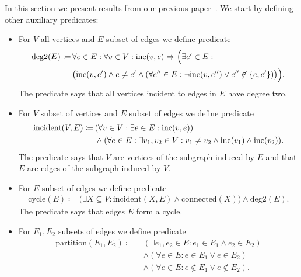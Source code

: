 In this section we present results from our previous paper~\cite{my_paper}.
We start by defining other auxiliary predicates:
%
\begin{itemize}
	\item For \( V \) all vertices and \( E \) subset of edges we define predicate
	      \begin{align*}
		      \text{deg2}(E) \coloneqq \,
		       & \forall e \in E : \forall v \in V : \text{inc} (v, e) \Rightarrow \Big( \exists e' \in E : \\
		       & \big( \text{inc} (v, e') \land e \ne e' \land (\forall e^{\prime\prime} \in E :
				      \lnot \text{inc} (v, e^{\prime\prime}) \lor e^{\prime\prime} \not\in \{e, e'\}) \big) \Big).
	      \end{align*}
	      The predicate says that all vertices incident to edges in \( E \) have degree two.
	\item For \( V \) subset of vertices and \( E \) subset of edges we define predicate
	      \begin{align*}
		      \text{incident}(V, E) \coloneqq \,
		       & (\forall v \in V : \exists e \in E : \text{inc} (v, e))                                                 \\
		       & \land (\forall e \in E : \exists v_1, v_2 \in V : v_1 \ne v_2 \land \text{inc} (v_1) \land \text{inc} (v_2)).
	      \end{align*}
	      The predicate says that \( V \) are vertices of the subgraph induced by \( E \)
	      and that \( E \) are edges of the subgraph induced by \( V \).
	\item For \( E \) subset of edges we define predicate
	      \begin{align*}
		      \text{cycle}(E) \coloneqq \,
		      \big( \exists X \subseteq V : \text{incident}(X, E) \land \text{connected}(X) \big)
		      \land \text{deg2}(E).
	      \end{align*}
	      The predicate says that edges \( E \) form a cycle.
	\item For \( E_1, E_2 \) subsets of edges we define predicate
	      \begin{align*}
		      \text{partition}(E_1, E_2) \coloneqq \, & (\exists e_1, e_2 \in E : e_1 \in E_1 \land e_2 \in E_2 )    \\
		                                              & \land (\forall e \in E : e \in E_1 \lor e \in E_2 )          \\
		                                              & \land (\forall e \in E : e \not\in E_1 \lor e \not\in E_2 ).

\end{align*}
\end{itemize}
